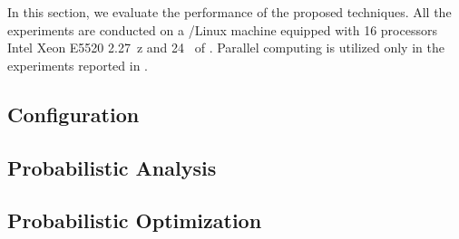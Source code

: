 In this section, we evaluate the performance of the proposed techniques.
All the experiments are conducted on a /Linux machine equipped with 16 processors Intel Xeon E5520 2.27~z and 24~ of .
Parallel computing is utilized only in the experiments reported in .

\subsection{Configuration} 


\subsection{Probabilistic Analysis} 


\subsection{Probabilistic Optimization} 

